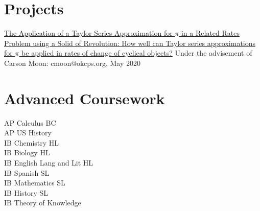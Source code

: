 \documentclass[12pt]{article}
\begin{document}
%

\section*{Projects}
\href{https://github.com/tttnguyen729/ee}{The Application of a Taylor Series Approximation for \(\pi\) in a Related Rates Problem using a Solid of Revolution: How well can Taylor series approximations for \(\pi\) be applied in rates of change of cyclical objects?} Under the advisement of Carson Moon: cmoon@okcps.org, May 2020 

\section*{Advanced Coursework}
\begin{multicols}{3}
AP Calculus BC \\
AP US History \\
IB Chemistry HL \\
IB Biology HL \\
IB English Lang and Lit HL \\
IB Spanish SL \\
IB Mathematics SL \\
IB History SL \\
IB Theory of Knowledge
\end{multicols}

\end{document}
